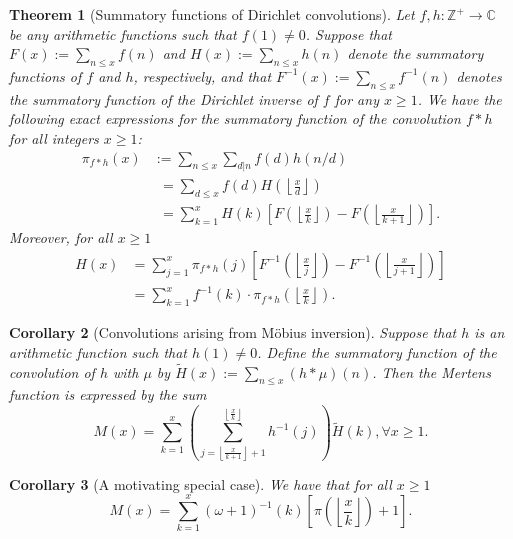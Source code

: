 \documentclass[11pt,reqno,a4letter]{article}
\numberwithin{figure}{section}
\numberwithin{table}{section}
\newcommand{\floor}[1]{\left\lfloor #1 \right\rfloor}
\newcommand{\Floor}[2]{\ensuremath{\left\lfloor \frac{#1}{#2} \right\rfloor}}
\theoremstyle{plain}
\newtheorem{theorem}{Theorem}
\newtheorem{cor}[theorem]{Corollary}
\numberwithin{theorem}{section}
\theoremstyle{definition}
\begin{document}
\begin{theorem}[Summatory functions of Dirichlet convolutions] 
\label{theorem_SummatoryFuncsOfDirCvls} 
Let $f,h: \mathbb{Z}^{+} \rightarrow \mathbb{C}$ be any arithmetic functions such that $f(1) \neq 0$. 
Suppose that $F(x) := \sum_{n \leq x} f(n)$ and $H(x) := \sum_{n \leq x} h(n)$ denote the summatory 
functions of $f$ and $h$, respectively, and that $F^{-1}(x) := \sum_{n \leq x} f^{-1}(n)$ 
denotes the summatory function of the 
Dirichlet inverse of $f$ for any $x \geq 1$. We have the following exact expressions for the 
summatory function of the convolution $f \ast h$ for all integers $x \geq 1$: 
\begin{align*} 
\pi_{f \ast h}(x) & := \sum_{n \leq x} \sum_{d|n} f(d) h(n/d) \\ 
     & \phantom{:}= \sum_{d \leq x} f(d) H\left(\Floor{x}{d}\right) \\ 
     & \phantom{:}= \sum_{k=1}^{x} H(k) \left[F\left(\Floor{x}{k}\right) - 
     F\left(\Floor{x}{k+1}\right)\right]. 
\end{align*} 
Moreover, for all $x \geq 1$ 
\begin{align*} 
H(x) & = \sum_{j=1}^{x} \pi_{f \ast h}(j) \left[F^{-1}\left(\Floor{x}{j}\right) - 
     F^{-1}\left(\Floor{x}{j+1}\right)\right] \\ 
     & = \sum_{k=1}^{x} f^{-1}(k) \cdot \pi_{f \ast h}\left(\Floor{x}{k}\right). 
\end{align*} 
\end{theorem} 

\begin{cor}[Convolutions arising from M\"obius inversion] 
\label{cor_CvlGAstMu} 
Suppose that $h$ is an arithmetic function such that 
$h(1) \neq 0$. Define the summatory function of 
the convolution of $h$ with $\mu$ by $\widetilde{H}(x) := \sum_{n \leq x} (h \ast \mu)(n)$. 
Then the Mertens function is expressed by the sum 
\[
M(x) = \sum_{k=1}^{x} \left(\sum_{j=\floor{\frac{x}{k+1}}+1}^{\floor{\frac{x}{k}}} h^{-1}(j)\right) 
     \widetilde{H}(k), \forall x \geq 1. 
\]
\end{cor} 

\begin{cor}[A motivating special case] 
\label{cor_Mx_gInvnPixk_formula} 
We have that for all $x \geq 1$ 
\begin{equation} 
\label{eqn_Mx_gInvnPixk_formula} 
M(x) = \sum_{k=1}^{x} (\omega+1)^{-1}(k) \left[\pi\left(\Floor{x}{k}\right) + 1\right]. 
\end{equation} 
\end{cor} 
\end{document}
